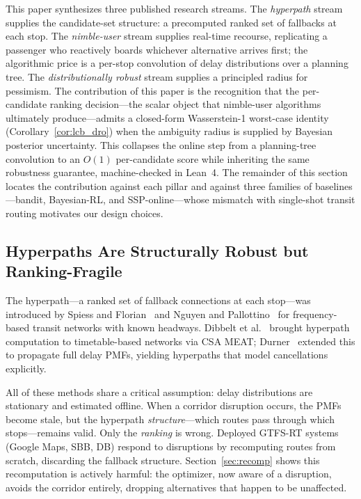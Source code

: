 \documentclass[11pt]{article}
\theoremstyle{definition}
\theoremstyle{remark}
\begin{document}
This paper synthesizes three published research streams. The \emph{hyperpath} stream \cite{spiess1989,nguyen1988,dibbelt2013,durner2024} supplies the candidate-set structure: a precomputed ranked set of fallbacks at each stop. The \emph{nimble-user} stream \cite{durner2024} supplies real-time recourse, replicating a passenger who reactively boards whichever alternative arrives first; the algorithmic price is a per-stop convolution of delay distributions over a planning tree. The \emph{distributionally robust} stream \cite{esfahani2018,blanchet2019} supplies a principled radius for pessimism. The contribution of this paper is the recognition that the per-candidate ranking decision---the scalar object that nimble-user algorithms ultimately produce---admits a closed-form Wasserstein-1 worst-case identity (Corollary~\ref{cor:lcb_dro}) when the ambiguity radius is supplied by Bayesian posterior uncertainty. This collapses the online step from a planning-tree convolution to an $O(1)$ per-candidate score while inheriting the same robustness guarantee, machine-checked in Lean~4. The remainder of this section locates the contribution against each pillar and against three families of baselines---bandit, Bayesian-RL, and SSP-online---whose mismatch with single-shot transit routing motivates our design choices.

\subsection{Hyperpaths Are Structurally Robust but Ranking-Fragile}

The hyperpath---a ranked set of fallback connections at each stop---was
introduced by Spiess and Florian~\cite{spiess1989} and
Nguyen and Pallottino~\cite{nguyen1988} for frequency-based transit
networks with known headways.
Dibbelt et al.~\cite{dibbelt2013} brought hyperpath computation to
timetable-based networks via CSA MEAT;
Durner~\cite{durner2024} extended this to propagate full delay PMFs,
yielding hyperpaths that model cancellations explicitly.

All of these methods share a critical assumption: delay distributions are
stationary and estimated offline.
When a corridor disruption occurs, the PMFs become stale, but the hyperpath
\emph{structure}---which routes pass through which stops---remains valid.
Only the \emph{ranking} is wrong.
Deployed GTFS-RT systems~\cite{gtfsrt2023} (Google Maps, SBB, DB) respond
to disruptions by recomputing routes from scratch, discarding the fallback
structure.
Section~\ref{sec:recomp} shows this recomputation is actively harmful:
the optimizer, now aware of a disruption, avoids the corridor entirely,
dropping alternatives that happen to be unaffected.
\end{document}
